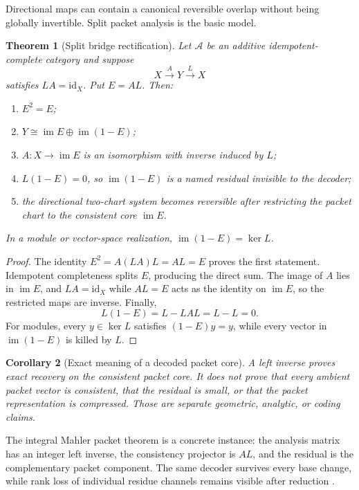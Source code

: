 \documentclass[11pt]{article}
\newtheorem{theorem}{Theorem}[section]
\newtheorem{corollary}[theorem]{Corollary}
\theoremstyle{definition}
\theoremstyle{remark}
\DeclareMathOperator{\im}{im}
\newcommand{\id}{\mathrm{id}}
\begin{document}
Directional maps can contain a canonical reversible overlap without being globally invertible.  Split packet analysis is the basic model.

\begin{theorem}[Split bridge rectification]
\label{thm:split-bridge-rectification}
Let \(\mathcal A\) be an additive idempotent-complete category and suppose
\[
X\xrightarrow{A}Y\xrightarrow{L}X
\]
satisfies \(LA=\id_X\).  Put \(E=AL\).  Then:
\begin{enumerate}[label=\textup{(\roman*)}]
\item \(E^2=E\);
\item \(Y\cong\im E\oplus\im(1-E)\);
\item \(A:X\to\im E\) is an isomorphism with inverse induced by \(L\);
\item \(L(1-E)=0\), so \(\im(1-E)\) is a named residual invisible to the decoder;
\item the directional two-chart system becomes reversible after restricting the packet chart to the consistent core \(\im E\).
\end{enumerate}
In a module or vector-space realization, \(\im(1-E)=\ker L\).
\end{theorem}

\begin{proof}
The identity \(E^2=A(LA)L=AL=E\) proves the first statement.  Idempotent completeness splits \(E\), producing the direct sum.  The image of \(A\) lies in \(\im E\), and \(L A=\id_X\) while \(A L=E\) acts as the identity on \(\im E\), so the restricted maps are inverse.  Finally,
\[
L(1-E)=L-LAL=L-L=0.
\]
For modules, every \(y\in\ker L\) satisfies \((1-E)y=y\), while every vector in \(\im(1-E)\) is killed by \(L\).
\end{proof}

\begin{corollary}[Exact meaning of a decoded packet core]
\label{cor:decoded-packet-core}
A left inverse proves exact recovery on the consistent packet core.  It does not prove that every ambient packet vector is consistent, that the residual is small, or that the packet representation is compressed.  Those are separate geometric, analytic, or coding claims.
\end{corollary}

The integral Mahler packet theorem is a concrete instance: the analysis matrix has an integer left inverse, the consistency projector is \(AL\), and the residual is the complementary packet component.  The same decoder survives every base change, while rank loss of individual residue channels remains visible after reduction \cite{CT4}.
\end{document}
